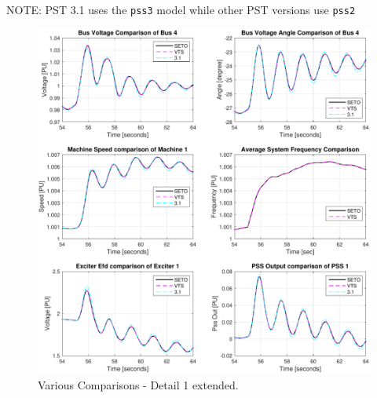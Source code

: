 \pagebreak

NOTE: PST 3.1 uses the \verb|pss3| model while other PST versions use \verb|pss2|
\begin{figure}[H]
	\centering
	\footnotesize
	\includegraphics[width=\linewidth]{examples/extendedTerm/extended-4}
	\caption{Various Comparisons - Detail 1 extended.}
	\label{fig: extended 4}
\end{figure}%

\pagebreak


